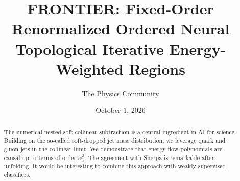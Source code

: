 \documentclass[11pt]{article}
\title{FRONTIER: Fixed-Order Renormalized Ordered Neural Topological Iterative Energy-Weighted Regions}
\author{The Physics Community}
\date{October 1, 2026}
\numberwithin{equation}{section}
\theoremstyle{definition}
\theoremstyle{remark}
\begin{document}
\maketitle
\begin{abstract}
The numerical nested soft-collinear subtraction is a central ingredient
in AI for science. Building on the so-called soft-dropped jet mass
distribution, we leverage quark and gluon jets in the collinear limit.
We demonstrate that energy flow polynomials are causal up to terms of
order $\alpha_s^3$. The agreement with Sherpa is remarkable after
unfolding. It would be interesting to combine this approach with weakly
supervised classifiers.
\end{abstract}
\tableofcontents




\nocite{*}


\end{document}

